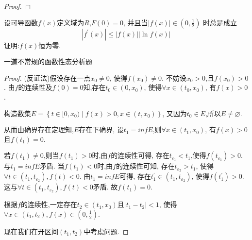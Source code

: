 \documentclass[lang=cn,newtx,10pt,scheme=chinese]{../Template/elegantbook}
\begin{document}
\begin{example}
\begin{proof}
\end{proof}
\end{example}

\begin{example}
设可导函数$f(x)$定义域为$R$,$F(0)=0$,
并且当$\left| f\left( x \right) \right|\in \left( 0,\frac{1}{2} \right) $
时总是成立
\begin{equation}
\left| f^{\prime}\left( x \right) \right|\leqslant \left| f\left( x \right) \right|\left| \ln f\left( x \right) \right|
\nonumber
\end{equation}
证明:$f(x)$恒为零.
\end{example}
\begin{note}
一道不常规的函数性态分析题
\end{note}
\begin{proof}
(反证法)假设存在一点$x_0\ne 0$,
使得$f(x_0)\ne 0$.
不妨设$x_0> 0$,且$f(x_0)>0$.
由$f$的连续性及$f(0)=0$知,存在$t_0\in(0,x_0)$,
使得$\forall x\in(t_0,x_0)$,
有$f(x)>0$.

构造数集$E=\left\{ t\in [0,x_0)\mid f\left( x \right) >0,x\in \left( t,x_0 \right) \right\} $,
又因为$t_0\in E$,所以$E \ne \varnothing $.

从而由确界存在定理知,$E$存在下确界,
设$t_1=inf E$,则$\forall x\in (t_1,x_0)$,
有$f(x)>0$且$f(t_1)=0$.

若$f(t_1)\ne 0$,则当$f(t_1)>0$时,由$f$的连续性可得,
存在$t_{\varepsilon_1}<t_1$,使得$f(t_{\varepsilon_1})>0$.
与$t_1=inf E$矛盾.
当$f(t_1)<0$时,由$f$的连续性可知,
存在$t_{\varepsilon_2}>t_1$,
使得$\forall t\in(t_1,t_{\varepsilon_2}),f(t)<0$.
由$t_1=inf E$可得,
存在$t_1^{\prime}\in (t_1,t_{\varepsilon_2})$,
使得$f(t_1^{\prime})>0$.这与$\forall t\in(t_1,t_{\varepsilon_2}),f(t)<0$矛盾.
故$f(t_1)=0$.

根据$f$的连续性,一定存在$t_2\in(t_1,x_0)$且$\left| t_1-t_2 \right|<1$,
使得$\forall x\in (t_1,t_2),f(x)\in(0,\frac{1}{2})$.

现在我们在开区间$(t_1,t_2)$中考虑问题.


\end{proof}
\end{document}
